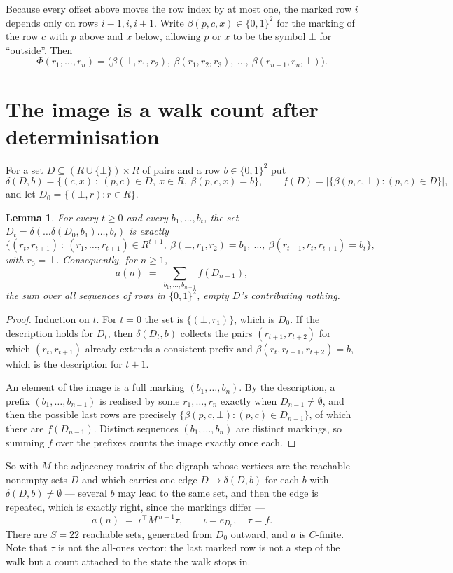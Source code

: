 \documentclass[11pt,a4paper]{article}
\theoremstyle{plain}
\newtheorem{lemma}[theorem]{Lemma}
\theoremstyle{definition}
\begin{document}
Because every offset above moves the row index by at most one, the marked row $i$ depends only
on rows $i-1,i,i+1$. Write $\beta(p,c,x)\in\{0,1\}^{2}$ for the marking of the row $c$
with $p$ above and $x$ below, allowing $p$ or $x$ to be the symbol $\bot$ for ``outside''.
Then
\[
\Phi(r_1,\dots,r_n)=\bigl(\beta(\bot,r_1,r_2),\ \beta(r_1,r_2,r_3),\ \dots,\
\beta(r_{n-1},r_n,\bot)\bigr).
\]

\section{The image is a walk count after determinisation}

For a set $D\subseteq(R\cup\{\bot\})\times R$ of pairs and a row $b\in\{0,1\}^{2}$ put
\[
\delta(D,b)=\{(c,x)\ :\ (p,c)\in D,\ x\in R,\ \beta(p,c,x)=b\},\qquad
f(D)=\bigl|\{\beta(p,c,\bot):(p,c)\in D\}\bigr| ,
\]
and let $D_0=\{(\bot,r):r\in R\}$.

\begin{lemma}\label{lem:det}
For every $t\ge0$ and every $b_1,\dots,b_t$, the set
$D_t=\delta(\dots\delta(D_0,b_1)\dots,b_t)$ is exactly
\[
\{(r_t,r_{t+1})\ :\ (r_1,\dots,r_{t+1})\in R^{t+1},\ \beta(\bot,r_1,r_2)=b_1,\ \dots,\
\beta(r_{t-1},r_t,r_{t+1})=b_t\} ,
\]
with $r_0=\bot$. Consequently, for $n\ge1$,
\[
a(n)\;=\;\sum_{b_1,\dots,b_{n-1}}f(D_{n-1}),
\]
the sum over all sequences of rows in $\{0,1\}^{2}$, empty $D$'s contributing nothing.
\end{lemma}

\begin{proof}
Induction on $t$. For $t=0$ the set is $\{(\bot,r_1)\}$, which is $D_0$. If the description
holds for $D_t$, then $\delta(D_t,b)$ collects the pairs $(r_{t+1},r_{t+2})$ for which
$(r_t,r_{t+1})$ already extends a consistent prefix and
$\beta(r_t,r_{t+1},r_{t+2})=b$, which is the description for $t+1$.

An element of the image is a full marking $(b_1,\dots,b_n)$. By the description, a prefix
$(b_1,\dots,b_{n-1})$ is realised by some $r_1,\dots,r_n$ exactly when $D_{n-1}\neq
\emptyset$, and then the possible last rows are precisely
$\{\beta(p,c,\bot):(p,c)\in D_{n-1}\}$, of which there are $f(D_{n-1})$. Distinct
sequences $(b_1,\dots,b_n)$ are distinct markings, so summing $f$ over the prefixes counts the
image exactly once each.
\end{proof}

So with $M$ the adjacency matrix of the digraph whose vertices are the reachable nonempty sets
$D$ and which carries one edge $D\to\delta(D,b)$ for each $b$ with $\delta(D,b)\neq\emptyset$
--- several $b$ may lead to the same set, and then the edge is repeated, which is exactly
right, since the markings differ ---
\[
a(n)\;=\;\iota^{\!\top}M^{\,n-1}\tau,\qquad \iota=e_{D_0},\quad \tau=f .
\]
There are $S=22$ reachable sets, generated from $D_0$ outward, and $a$ is $C$-finite. Note
that $\tau$ is not the all-ones vector: the last marked row is not a step of the walk but a
count attached to the state the walk stops in.
\end{document}
